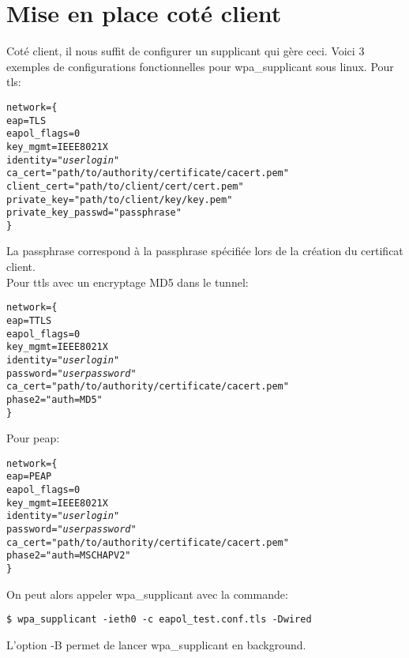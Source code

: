 \section{Mise en place coté client}
Coté client, il nous suffit de configurer un supplicant qui gère ceci. 
Voici 3 exemples de configurations fonctionnelles pour wpa\_supplicant sous linux. 
Pour tls:
\begin{alltt}
network=\{
    eap=TLS
    eapol_flags=0
    key_mgmt=IEEE8021X
    identity="\textit{userlogin}"
    ca_cert="path/to/authority/certificate/cacert.pem"
    client_cert="path/to/client/cert/cert.pem"
    private_key="path/to/client/key/key.pem"
    private_key_passwd="passphrase"
\}
\end{alltt}
La passphrase correspond à la passphrase spécifiée lors de la création du certificat client.\\
Pour ttls avec un encryptage MD5 dans le tunnel:
\begin{alltt}
network=\{
    eap=TTLS
    eapol_flags=0
    key_mgmt=IEEE8021X
    identity="\textit{userlogin}"
    password="\textit{userpassword}"
    ca_cert="path/to/authority/certificate/cacert.pem"
    phase2="auth=MD5"
\}
\end{alltt}
Pour peap:
\begin{alltt}
network=\{
    eap=PEAP
    eapol_flags=0
    key_mgmt=IEEE8021X
    identity="\textit{userlogin}"
    password="\textit{userpassword}"
    ca_cert="path/to/authority/certificate/cacert.pem"
    phase2="auth=MSCHAPV2"
\}
\end{alltt}

On peut alors appeler wpa\_supplicant avec la commande:
\begin{verbatim}
$ wpa_supplicant -ieth0 -c eapol_test.conf.tls -Dwired
\end{verbatim}
L'option -B permet de lancer wpa\_supplicant en background.








\newpage


